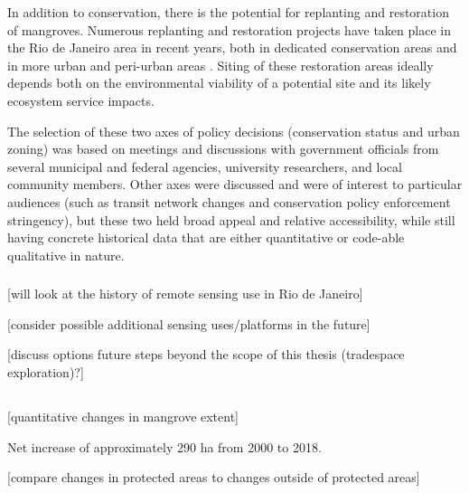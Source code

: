 In addition to conservation, there is the potential for replanting and restoration of mangroves. Numerous replanting and restoration projects have taken place in the Rio de Janeiro area in recent years, both in dedicated conservation areas \cite{granadoAssessingGeneticDiversity2018} and in more urban and peri-urban areas \cite{rioprefeituraEnvironmentalRecoveryRodrigo2019, soaresEstruturaVegetalGrau1999}. Siting of these restoration areas ideally depends both on the environmental viability of a potential site and its likely ecosystem service impacts.

The selection of these two axes of policy decisions (conservation status and urban zoning) was based on meetings and discussions with government officials from several municipal and federal agencies, university researchers, and local community members. Other axes were discussed and were of interest to particular audiences (such as transit network changes and conservation policy enforcement stringency), but these two held broad appeal and relative accessibility, while still having concrete historical data that are either quantitative or code-able qualitative in nature. 



\subsubsection{}

[will look at the history of remote sensing use in Rio de Janeiro]

[consider possible additional sensing uses/platforms in the future]

[discuss options future steps beyond the scope of this thesis (tradespace exploration)?]

\subsection{} \label{sec:rio-evdt-result}

\subsubsection{} \label{sec:rio-evdt-e-result}

[quantitative changes in mangrove extent]

Net increase of approximately 290 ha from 2000 to 2018.


[compare changes in protected areas to changes outside of protected areas]

